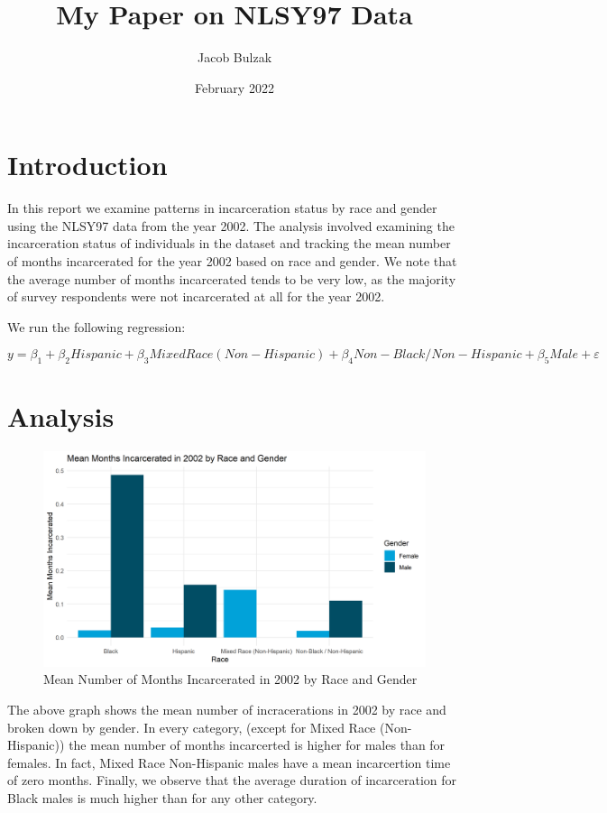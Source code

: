 \documentclass{article}
\author{Jacob Bulzak}
\title{My Paper on NLSY97 Data}
\date{February 2022}
\begin{document}
\maketitle

\section{Introduction}

In this report we examine patterns in incarceration status by race and gender using the NLSY97 data from the year 2002. The analysis involved examining the incarceration status of  individuals in the dataset and tracking the mean number of months incarcerated for the year 2002 based on race and gender. We note that the average number of months incarcerated tends to be very low, as the majority of survey respondents were not incarcerated at all for the year 2002.

We run the following regression:

\begin{equation*}
    y = \beta_1 + \beta_2 Hispanic + \beta_3 Mixed Race (Non-Hispanic)+ \beta_4 Non-Black / Non-Hispanic + \beta_5 Male + \varepsilon
\end{equation*}

\section{Analysis}


\begin{figure}[H]
    \begin{center}
        \includegraphics[width=.85\textwidth]{incarcerated_by_racegender}
    \end{center}
    \caption{Mean Number of Months Incarcerated in 2002 by Race and Gender}
    \label{fig:graph}
\end{figure}

The above graph shows the mean number of incracerations in 2002 by race and broken down by gender. In every category, (except for Mixed Race (Non-Hispanic)) the mean number of months incarcerted is higher for males than for females. In fact, Mixed Race Non-Hispanic males have a mean incarcertion time of zero months. Finally, we observe that the average duration of incarceration for Black males is much higher than for any other category.
\end{document}
